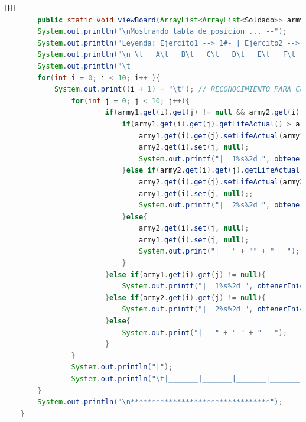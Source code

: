 \documentclass{article}
\begin{document}
	\begin{lstlisting}[language=java,caption={Las lineas de codigos de la clase Mapa:}][H]
		public static void viewBoard(ArrayList<ArrayList<Soldado>> army1, ArrayList<ArrayList<Soldado>> army2){ //EN ESTE METODO DEMOSTRAREMOS LA TABLA REUTILIZAREMOS CODIGOS DE ANTERIORES LABORATORIOS PARA PODER HACER LA BASE DE ESTE TABLERO
        System.out.println("\nMostrando tabla de posicion ... --");
        System.out.println("Leyenda: Ejercito1 --> 1#- | Ejercito2 --> 2#-"); //RECONOCIMIENTO PARA LOS EJERCITOS Y POSICION DE SUS SOLDADOS
        System.out.println("\n \t   A\t   B\t   C\t   D\t   E\t   F\t   G\t   H\t   I\t   J"); // RECONOCIMIENTO PARA CADA UBICACION DE CADA SOLDADO EN EL TABLERO POR PARTE DE LAS COLUMNAS
        System.out.println("\t_________________________________________________________________________________");
        for(int i = 0; i < 10; i++ ){
            System.out.print((i + 1) + "\t"); // RECONOCIMIENTO PARA CADA UBICACION DE CADA SOLDADO EN EL TABLERO POR PARTE DE LAS FILAS
                for(int j = 0; j < 10; j++){
                        if(army1.get(i).get(j) != null && army2.get(i).get(j) != null){ //CREAMOS UN IF PARA QUE ESTE NOS AYUDE A SABER QUIEN DE ESTOS SOLDADOS SE OCUPARA DEL CASILLERO EL CUAL DONDE ESTAN PELEANDO
                            if(army1.get(i).get(j).getLifeActual() > army2.get(i).get(j).getLifeActual()){
                                army1.get(i).get(j).setLifeActual(army1.get(i).get(j).getLifeActual() - army2.get(i).get(j).getLifeActual()); //Cambiamos 
                                army2.get(i).set(j, null); 
                                System.out.printf("|  1%s%2d ", obtenerInicial(army1.get(i).get(j)), army1.get(i).get(j).getLifeActual());
                            }else if(army2.get(i).get(j).getLifeActual() > army1.get(i).get(j).getLifeActual()){
                                army2.get(i).get(j).setLifeActual(army2.get(i).get(j).getLifeActual() - army1.get(i).get(j).getLifeActual());
                                army1.get(i).set(j, null);;
                                System.out.printf("|  2%s%2d ", obtenerInicial(army2.get(i).get(j)), army2.get(i).get(j).getLifeActual());
                            }else{
                                army2.get(i).set(j, null);
                                army1.get(i).set(j, null);
                                System.out.print("|   " + "" + "   ");
                            }
                        }else if(army1.get(i).get(j) != null){
                            System.out.printf("|  1%s%2d ", obtenerInicial(army1.get(i).get(j)), army1.get(i).get(j).getLifeActual());
                        }else if(army2.get(i).get(j) != null){
                            System.out.printf("|  2%s%2d ", obtenerInicial(army2.get(i).get(j)), army2.get(i).get(j).getLifeActual());
                        }else{
                            System.out.print("|   " + " " + "   ");
                        }
                }
                System.out.println("|");
                System.out.println("\t|_______|_______|_______|_______|_______|_______|_______|_______|_______|_______|");
        }
        System.out.println("\n*********************************");
    }
	\end{lstlisting}
\end{document}
